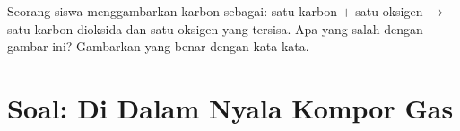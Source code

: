 \begin{exercise}[$\star\star\star$]\label{exo:g7:chemical-reactions:12}
Seorang siswa menggambarkan  karbon sebagai: satu  karbon
$+$ satu  oksigen $\longrightarrow$ satu  karbon dioksida
dan satu  oksigen yang tersisa. Apa yang salah dengan gambar ini?
Gambarkan yang benar dengan kata-kata.
\end{exercise}

\section{Soal: Di Dalam Nyala Kompor Gas}

